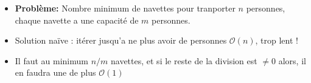 \begin{frame}
    \frametitle{\problemtitle}
    \begin{itemize}
        \item<+-> \textbf{Problème:} Nombre minimum de navettes pour tranporter $n$ personnes, chaque navette a une capacité de $m$ personnes.
        \item Solution na\"ive : itérer jusqu'a ne plus avoir de personnes $\mathcal O(n)$, trop lent !
        \item<+->  Il faut au minimum $n / m$ navettes, et si le reste de la division est $\ne 0$ alors, il en faudra une de plus $\mathcal O(1)$
    \end{itemize}
    \solvestats
\end{frame}
